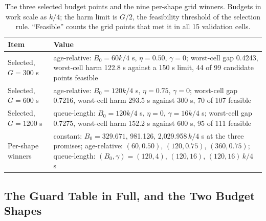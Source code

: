 \documentclass[mathematics,supfile,submit,moreauthors]{Definitions/mdpi}
\newcommand{\devnum}[1]{#1}
\begin{document}
\begin{table}[H]
\centering
\caption{The three selected budget points and the nine per-shape grid winners. Budgets in
work scale as $k/4$; the harm limit is $G/2$, the feasibility threshold of the selection
rule. ``Feasible'' counts the grid points that met it in all \devnum{15} validation cells.}
\label{tab:s_setup}
\small
\begin{tabular}{p{}p{}}
\toprule
Item & Value \\
\midrule
Selected, $G = \devnum{300}$ s & age-relative: $B_0 = \devnum{60}k/4$ s, $\eta = \devnum{0.50}$, $\gamma = \devnum{0}$; worst-cell gap \devnum{0.4243}, worst-cell harm \devnum{122.8} s against a \devnum{150} s limit, \devnum{44} of \devnum{99} candidate points feasible \\
Selected, $G = \devnum{600}$ s & age-relative: $B_0 = \devnum{120}k/4$ s, $\eta = \devnum{0.75}$, $\gamma = \devnum{0}$; worst-cell gap \devnum{0.7216}, worst-cell harm \devnum{293.5} s against \devnum{300} s, \devnum{70} of \devnum{107} feasible \\
Selected, $G = \devnum{1200}$ s & queue-length: $B_0 = \devnum{120}k/4$ s, $\eta = \devnum{0}$, $\gamma = \devnum{16}k/4$ s; worst-cell gap \devnum{0.7275}, worst-cell harm \devnum{152.2} s against \devnum{600} s, \devnum{95} of \devnum{111} feasible \\
Per-shape winners & constant: $B_0 = \devnum{329.671}$, \devnum{981.126}, \devnum{2{,}029.958}\,$k/4$ s at the three promises; age-relative: $(\devnum{60}, \devnum{0.50})$, $(\devnum{120}, \devnum{0.75})$, $(\devnum{360}, \devnum{0.75})$; queue-length: $(B_0, \gamma) = (\devnum{120}, \devnum{4})$, $(\devnum{120}, \devnum{16})$, $(\devnum{120}, \devnum{16})$\,$k/4$ s \\
\bottomrule
\end{tabular}
\end{table}

\subsection{The Guard Table in Full, and the Two Budget Shapes}
\end{document}

